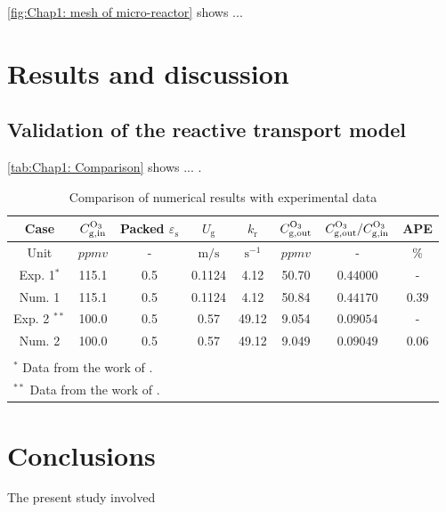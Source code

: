 \begin{refsection}
\autoref{fig:Chap1: mesh of micro-reactor} shows ...

\section{Results and discussion}
\label{sec:Chap1: Results and discussion}
\subsection{Validation of the reactive transport model}

\autoref{tab:Chap1: Comparison} shows ... \autocite{liujs2016, wang2014catalytic}. 

\begin{table}[htb]
    \centering
    \vspace{10pt}
    \caption{Comparison of numerical results with experimental data}
    \begin{tabular}{cccccccc}
        \toprule
        Case & $C_{\mathrm{g,in}}^{\ce{O3}}$ & Packed $\varepsilon_{\mathrm{s}}$ & $U_{\mathrm{g}}$ & $k_\mathrm{r}$ & $C_{\mathrm{g,out}}^{\ce{O3}}$ & $ C_{\mathrm{g,out}}^{\ce{O3}}/C_{\mathrm{g,in}}^{\ce{O3}}$ & APE \\ 
        \midrule
        Unit & $\si{ppmv}$ & - & $\si{\m/\s}$ & $\si{\s^{-1}}$ & $\si{ppmv}$ & - & \% \\
        \midrule
        Exp. 1$^{*}$ & 115.1 & 0.5 & 0.1124 & 4.12 & 50.70 & $\num{0.44000}$ & - \\
        Num. 1 & 115.1 & 0.5 & 0.1124 & 4.12 & 50.84 & $\num{0.44170}$ & 0.39 \\
        Exp. 2 $^{**}$ & 100.0 & 0.5 & 0.57 & 49.12 & 9.054 & $\num{0.09054}$ & - \\
        Num. 2 & 100.0 & 0.5 & 0.57 & 49.12 & 9.049 & $\num{0.09049}$ & 0.06 \\
        \bottomrule \\[-10pt]
        \multicolumn{8}{l}{\footnotesize{
            $^*$ Data from the work of \textcite{liujs2016}.}} \\
        \multicolumn{8}{l}{\footnotesize{
            $^{**}$ Data from the work of \textcite{wang2014catalytic}.}} 
    \end{tabular}
    \label{tab:Chap1: Comparison}
\end{table}

\section{Conclusions}
The present study involved 

\pagebreak
{}

\begin{spacing}{1.1}
    \printbibliography[heading=subbibliography]
\end{spacing}
\end{refsection}